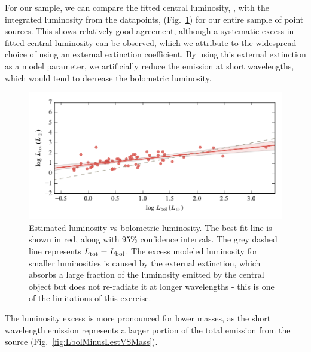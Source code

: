 For our sample, we can compare the fitted central luminosity, \Ltot, with the integrated luminosity from the datapoints, \Lbol (Fig.~\ref{fig:LbolVsLest}) for our entire sample of point sources. This shows relatively good agreement, although a systematic excess in fitted central luminosity can be observed, which we attribute to the widespread choice of using an external extinction coefficient. By using this external extinction as a model parameter, we artificially reduce the emission at short wavelengths, which would tend to decrease the bolometric luminosity.
\begin{figure}[!h]
\begin{center}
\includegraphics[width=\textwidth]{Figures/LbolVsLest.pdf}
\vspace{-1cm}
\caption[Estimated luminosity vs bolometric luminosity]{Estimated luminosity vs bolometric luminosity. The best fit line is shown in red, along with 95\% confidence intervals. The grey dashed line represents $L_\textrm{tot} = L_\textrm{bol}$. The excess modeled luminosity for smaller luminosities is caused by the external extinction, which absorbs a large fraction of the luminosity emitted by the central object but does not re-radiate it at longer wavelengths - this is one of the limitations of this exercise.}
\label{fig:LbolVsLest}
\end{center}
\end{figure}

The luminosity excess is more pronounced for lower masses, as the short wavelength emission represents a larger portion of the total emission from the source (Fig.~\ref{fig:LbolMinusLestVSMass}). 

